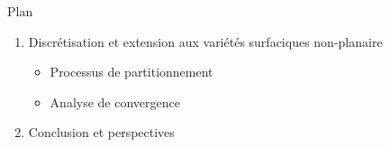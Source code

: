 \documentclass[compress,10pt,aspectratio=169]{beamer}
\begin{document}
\begin{frame}{Plan}
\begin{enumerate}
        \item Discrétisation et extension aux variétés surfaciques non-planaire %
        \vspace{0.26cm}
        \begin{itemize}
            \item Processus de partitionnement\\\vspace{0.18cm}
            \item Analyse de convergence\\\vspace{0.18cm}
        \end{itemize}
        \item Conclusion et perspectives
    \end{enumerate}
\end{frame}
\end{document}
